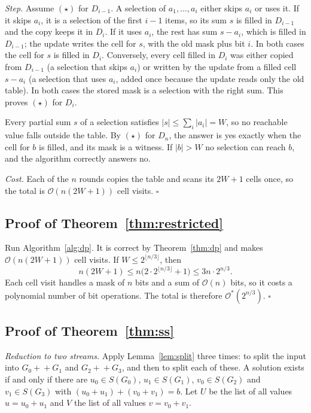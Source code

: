 \documentclass[conference]{IEEEtran}
\newcommand{\Oh}{\mathcal{O}}
\begin{document}
\emph{Step.} Assume $(\star)$ for $D_{i-1}$. A selection of $a_1,\dots,a_i$
either skips $a_i$ or uses it. If it skips $a_i$, it is a selection of the
first $i-1$ items, so its sum $s$ is filled in $D_{i-1}$ and the copy keeps it
in $D_i$. If it uses $a_i$, the rest has sum $s-a_i$, which is filled in
$D_{i-1}$; the update writes the cell for $s$, with the old mask plus bit $i$.
In both cases the cell for $s$ is filled in $D_i$. Conversely, every cell filled
in $D_i$ was either copied from $D_{i-1}$ (a selection that skips $a_i$) or
written by the update from a filled cell $s-a_i$ (a selection that uses $a_i$,
added once because the update reads only the old table). In both cases the
stored mask is a selection with the right sum. This proves $(\star)$ for $D_i$.

Every partial sum $s$ of a selection satisfies $|s|\le\sum_i|a_i|=W$, so no
reachable value falls outside the table. By $(\star)$ for $D_n$, the answer is
yes exactly when the cell for $b$ is filled, and its mask is a witness. If
$|b|>W$ no selection can reach $b$, and the algorithm correctly answers no.

\emph{Cost.} Each of the $n$ rounds copies the table and scans its $2W+1$
cells once, so the total is $\Oh(n(2W+1))$ cell visits. \hfill$\square$

\subsection{Proof of Theorem~\ref{thm:restricted}}
Run Algorithm~\ref{alg:dp}. It is correct by Theorem~\ref{thm:dp} and makes
$\Oh(n(2W+1))$ cell visits. If $W\le2^{\lfloor n/3\rfloor}$, then
\[
n(2W+1)\le n\bigl(2\cdot2^{\lfloor n/3\rfloor}+1\bigr)\le 3n\cdot2^{n/3}.
\]
Each cell visit handles a mask of $n$ bits and a sum of $\Oh(n)$ bits, so it
costs a polynomial number of bit operations. The total is therefore
$\Oh^*(2^{n/3})$. \hfill$\square$

\subsection{Proof of Theorem~\ref{thm:ss}}
\emph{Reduction to two streams.} Apply Lemma~\ref{lem:split} three times: to
split the input into $G_0+\!+G_1$ and $G_2+\!+G_3$, and then to split each of
these. A solution exists if and only if there are $u_0\in S(G_0)$,
$u_1\in S(G_1)$, $v_0\in S(G_2)$ and $v_1\in S(G_3)$ with
$(u_0+u_1)+(v_0+v_1)=b$. Let $U$ be the list of all values $u=u_0+u_1$ and $V$
the list of all values $v=v_0+v_1$.
\end{document}
